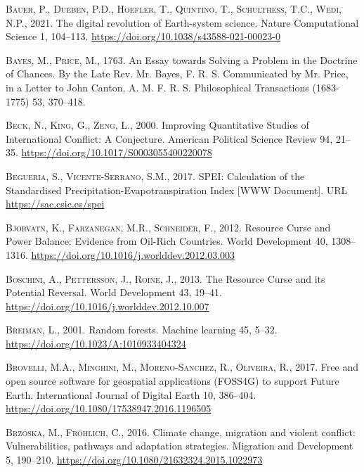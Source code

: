 \documentclass[a4paper,11pt]{article}
\begin{document}
\leavevmode\hypertarget{ref-bauer2021}{}%
\textsc{Bauer, P., Dueben, P.D., Hoefler, T., Quintino, T., Schulthess, T.C., Wedi, N.P.}, 2021. The digital revolution of Earth-system science. Nature Computational Science 1, 104--113. \url{https://doi.org/10.1038/s43588-021-00023-0}

\leavevmode\hypertarget{ref-bayes1763}{}%
\textsc{Bayes, M., Price, M.}, 1763. An Essay towards Solving a Problem in the Doctrine of Chances. By the Late Rev. Mr. Bayes, F. R. S. Communicated by Mr. Price, in a Letter to John Canton, A. M. F. R. S. Philosophical Transactions (1683-1775) 53, 370--418.

\leavevmode\hypertarget{ref-beck2000}{}%
\textsc{Beck, N., King, G., Zeng, L.}, 2000. Improving Quantitative Studies of International Conflict: A Conjecture. American Political Science Review 94, 21--35. \url{https://doi.org/10.1017/S0003055400220078}

\leavevmode\hypertarget{ref-begueria2017}{}%
\textsc{Begueria, S., Vicente-Serrano, S.M.}, 2017. SPEI: Calculation of the Standardised Precipitation-Evapotranspiration Index {[}WWW Document{]}. URL \url{https://sac.csic.es/spei}

\leavevmode\hypertarget{ref-bjorvatn2012}{}%
\textsc{Bjorvatn, K., Farzanegan, M.R., Schneider, F.}, 2012. Resource Curse and Power Balance: Evidence from Oil-Rich Countries. World Development 40, 1308--1316. \url{https://doi.org/10.1016/j.worlddev.2012.03.003}

\leavevmode\hypertarget{ref-boschini2013}{}%
\textsc{Boschini, A., Pettersson, J., Roine, J.}, 2013. The Resource Curse and its Potential Reversal. World Development 43, 19--41. \url{https://doi.org/10.1016/j.worlddev.2012.10.007}

\leavevmode\hypertarget{ref-breiman2001}{}%
\textsc{Breiman, L.}, 2001. Random forests. Machine learning 45, 5--32. \url{https://doi.org/10.1023/A:1010933404324}

\leavevmode\hypertarget{ref-brovelli2017}{}%
\textsc{Brovelli, M.A., Minghini, M., Moreno-Sanchez, R., Oliveira, R.}, 2017. Free and open source software for geospatial applications (FOSS4G) to support Future Earth. International Journal of Digital Earth 10, 386--404. \url{https://doi.org/10.1080/17538947.2016.1196505}

\leavevmode\hypertarget{ref-brzoska2016}{}%
\textsc{Brzoska, M., Fröhlich, C.}, 2016. Climate change, migration and violent conflict: Vulnerabilities, pathways and adaptation strategies. Migration and Development 5, 190--210. \url{https://doi.org/10.1080/21632324.2015.1022973}
\end{document}
